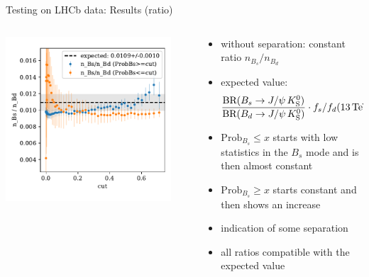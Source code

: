 \documentclass[aspectratio=1610, 10pt]{beamer}
\begin{document}
\begin{frame}{Testing on LHCb data: Results (ratio)}
  \begin{columns}
    \begin{column}{0.5\textwidth}
      \centering
      \includegraphics[width=0.9\textwidth]{images/data_ratio.pdf}
    \end{column}
    \begin{column}{0.5\textwidth}
      \begin{itemize}
        \item without separation: constant ratio $n_{B_s}/n_{B_d}$
        \item expected value: \\
        \begin{equation*}
          \frac{\text{BR}(B_s \rightarrow J/\psi \, K^0_\text{S})}{\text{BR}(B_d \rightarrow J/\psi \, K^0_\text{S})} \cdot f_s/f_d(\qty{13}{\TeV}) = \num{0.0109\pm0.0010}
        \end{equation*}
        \item $\text{Prob}_{B_s} \leq x$ starts with low statistics in the $B_s$ mode and is then almost constant
        \item $\text{Prob}_{B_s} \geq x$ starts constant and then shows an increase 
        \item indication of some separation
        \item all ratios compatible with the expected value
      \end{itemize}
    \end{column}
  \end{columns}
\end{frame}
\end{document}
